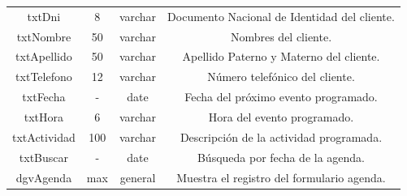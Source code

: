 \documentclass[12pt,a4paper,oneside]{book}
\begin{document}
\begin{enumerate}
\begin{enumerate}
\begin{enumerate}
\begin{table}[t]
\begin{tabular}{| c | c | c | c | }
									\hline
									txtDni & 8 &varchar & Documento Nacional de Identidad del cliente. \\
									txtNombre & 50 & varchar & Nombres del cliente. \\
									txtApellido & 50 & varchar & Apellido Paterno y Materno del cliente. \\
									txtTelefono & 12 & varchar & Número telefónico del cliente. \\
									txtFecha & - &	date & Fecha del próximo evento programado. \\
									txtHora	& 6 & varchar & Hora del evento programado. \\
									txtActividad & 100 & varchar & Descripción de la actividad programada. \\
									txtBuscar & - &	date & Búsqueda por fecha de la agenda. \\
									dgvAgenda & max & general & Muestra el registro del formulario agenda. \\ 
									
									\hline
									
								\end{tabular}
								\label{tab:FrmAgenda}	
									
								\end{table}
						
							
				

					\end{enumerate}
				
				
				
				
			\end{enumerate}
			
		  
	\end{enumerate}
	
	
\end{document}
